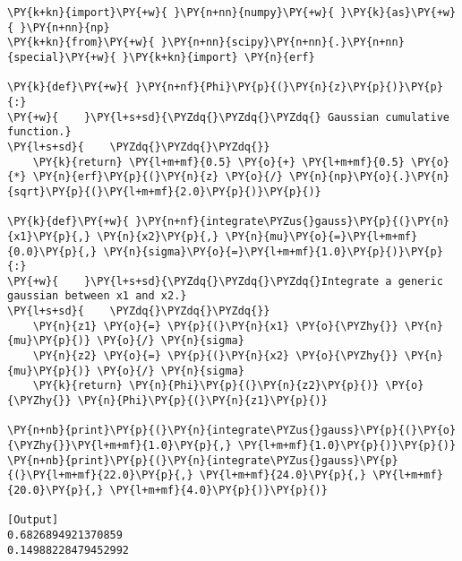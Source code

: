 \begin{Verbatim}[label=\makebox{\href{https://github.com/unipi-physics-labs/lab1-notes/tree/main/snippy/erf.py}{https://github.com/.../erf.py}},commandchars=\\\{\}]
\PY{k+kn}{import}\PY{+w}{ }\PY{n+nn}{numpy}\PY{+w}{ }\PY{k}{as}\PY{+w}{ }\PY{n+nn}{np}
\PY{k+kn}{from}\PY{+w}{ }\PY{n+nn}{scipy}\PY{n+nn}{.}\PY{n+nn}{special}\PY{+w}{ }\PY{k+kn}{import} \PY{n}{erf}

\PY{k}{def}\PY{+w}{ }\PY{n+nf}{Phi}\PY{p}{(}\PY{n}{z}\PY{p}{)}\PY{p}{:}
\PY{+w}{    }\PY{l+s+sd}{\PYZdq{}\PYZdq{}\PYZdq{} Gaussian cumulative function.}
\PY{l+s+sd}{    \PYZdq{}\PYZdq{}\PYZdq{}}
    \PY{k}{return} \PY{l+m+mf}{0.5} \PY{o}{+} \PY{l+m+mf}{0.5} \PY{o}{*} \PY{n}{erf}\PY{p}{(}\PY{n}{z} \PY{o}{/} \PY{n}{np}\PY{o}{.}\PY{n}{sqrt}\PY{p}{(}\PY{l+m+mf}{2.0}\PY{p}{)}\PY{p}{)}

\PY{k}{def}\PY{+w}{ }\PY{n+nf}{integrate\PYZus{}gauss}\PY{p}{(}\PY{n}{x1}\PY{p}{,} \PY{n}{x2}\PY{p}{,} \PY{n}{mu}\PY{o}{=}\PY{l+m+mf}{0.0}\PY{p}{,} \PY{n}{sigma}\PY{o}{=}\PY{l+m+mf}{1.0}\PY{p}{)}\PY{p}{:}
\PY{+w}{    }\PY{l+s+sd}{\PYZdq{}\PYZdq{}\PYZdq{}Integrate a generic gaussian between x1 and x2.}
\PY{l+s+sd}{    \PYZdq{}\PYZdq{}\PYZdq{}}
    \PY{n}{z1} \PY{o}{=} \PY{p}{(}\PY{n}{x1} \PY{o}{\PYZhy{}} \PY{n}{mu}\PY{p}{)} \PY{o}{/} \PY{n}{sigma}
    \PY{n}{z2} \PY{o}{=} \PY{p}{(}\PY{n}{x2} \PY{o}{\PYZhy{}} \PY{n}{mu}\PY{p}{)} \PY{o}{/} \PY{n}{sigma}
    \PY{k}{return} \PY{n}{Phi}\PY{p}{(}\PY{n}{z2}\PY{p}{)} \PY{o}{\PYZhy{}} \PY{n}{Phi}\PY{p}{(}\PY{n}{z1}\PY{p}{)}

\PY{n+nb}{print}\PY{p}{(}\PY{n}{integrate\PYZus{}gauss}\PY{p}{(}\PY{o}{\PYZhy{}}\PY{l+m+mf}{1.0}\PY{p}{,} \PY{l+m+mf}{1.0}\PY{p}{)}\PY{p}{)}
\PY{n+nb}{print}\PY{p}{(}\PY{n}{integrate\PYZus{}gauss}\PY{p}{(}\PY{l+m+mf}{22.0}\PY{p}{,} \PY{l+m+mf}{24.0}\PY{p}{,} \PY{l+m+mf}{20.0}\PY{p}{,} \PY{l+m+mf}{4.0}\PY{p}{)}\PY{p}{)}

[Output]
0.6826894921370859
0.14988228479452992
\end{Verbatim}
